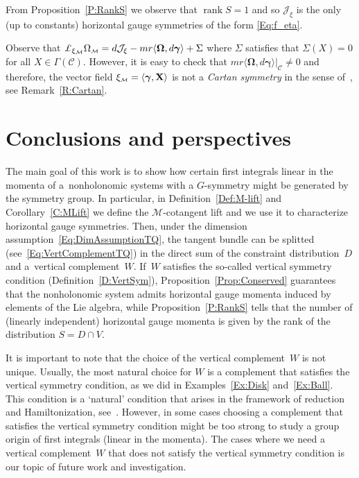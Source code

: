 \documentclass[10pt,a4paper]{amsart}
\numberwithin{equation}{section}
\def\M{\mathcal{M}}
\def\J{\mathcal{J}}
\def\C{\mathcal{C}}
\def\subM{{\mbox{\tiny{$\M$}}}}
\def\vecOm{\boldsymbol{\Omega}}
\def\vecgamma{\boldsymbol{\gamma}}
\begin{document}
From Proposition~\ref{P:RankS} we observe that $\operatorname{rank}S =1$ and so $\J_\xi$ is the only (up to constants) horizontal gauge symmetries of the form \eqref{Eq:f_eta}.

\begin{Remark} Observe that $\pounds_{\xi_\subM} \Omega_\subM = d\J_\xi - mr\langle \vecOm, d\vecgamma\rangle + \Sigma$ where $\Sigma$ satisf\/ies that $\Sigma (X) = 0$ for all $X\in \Gamma(\C)$. However, it is easy to check that $mr\langle \vecOm, d\vecgamma\rangle |_\C \neq 0 $ and therefore, the vector f\/ield $\xi_\subM = \langle \vecgamma, {\bf X} \rangle$ is not a {\it Cartan symmetry} in the sense of~\cite{Crampin-Mestdag}, see Remark~\ref{R:Cartan}.
\end{Remark}

\section{Conclusions and perspectives}
The main goal of this work is to show how certain f\/irst integrals linear in the momenta of a~nonholonomic systems with a $G$-symmetry might be generated by the symmetry group.
In particular, in Def\/inition~\ref{Def:M-lift} and Corollary~\ref{C:MLift} we def\/ine the $\M$-cotangent lift and we use it to characterize
horizontal gauge symmetries.
Then, under the dimension assumption~\eqref{Eq:DimAssumptionTQ}, the tangent
bundle can be splitted (see~\eqref{Eq:VertComplementTQ})
in the direct sum of the constraint distribution~$D$ and a~vertical complement~$W$.
If~$W$ satisf\/ies the so-called vertical symmetry condition (Def\/inition~\ref{D:VertSym}),
Proposition~\ref{Prop:Conserved} guarantees  that the nonholonomic system admits
horizontal gauge momenta induced by elements of the Lie algebra, while
Proposition~\ref{P:RankS} tells that the number of (linearly independent)
horizontal gauge momenta is given by the rank of the distribution $S=D\cap V$.

It is important to note that the choice of the vertical complement~$W$ is not unique.
Usually, the most natural choice for $W$ is a complement that satisf\/ies the vertical
symmetry condition, as we did in Examples~\ref{Ex:Disk} and~\ref{Ex:Ball}. This condition
is a `natural' condition that arises in the framework of reduction and Hamiltonization,
see~\cite{Paula}.  However, in some cases choosing a complement that satisf\/ies
the vertical symmetry condition might be too strong to study a group origin
of f\/irst integrals (linear in the momenta).  The cases where we need a vertical
complement~$W$ that does not satisfy the vertical symmetry condition is our
topic of future work and investigation.
\end{document}

